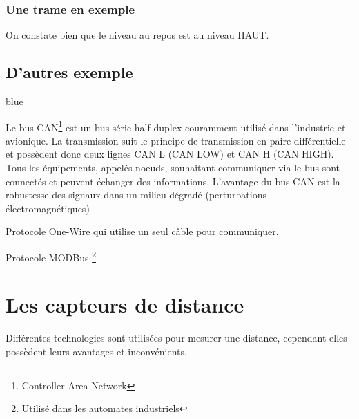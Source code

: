 \subsubsection{Une trame en exemple}

On constate bien que le niveau au repos est au niveau HAUT.



\subsection{D'autres exemple}

\begin{items}{blue}{\Triangle}
    \item Le bus CAN\footnote{Controller Area Network} est un bus série half-duplex couramment 
    utilisé dans l'industrie et avionique. La transmission suit le principe de transmission en paire différentielle et possèdent donc deux lignes CAN L (CAN LOW) et CAN H (CAN HIGH). Tous les équipements, appelés noeuds, souhaitant communiquer via le bus sont connectés et peuvent échanger des informations.
    L'avantage du bus CAN est la robustesse des signaux dans un milieu dégradé (perturbations électromagnétiques)
    \item Protocole One-Wire qui utilise un seul câble pour communiquer.
    \item Protocole MODBus \footnote{Utilisé dans les automates industriels}
\end{items}



\section{Les capteurs de distance}

Différentes technologies sont utilisées pour mesurer une distance, cependant elles possèdent leurs avantages et inconvénients.


